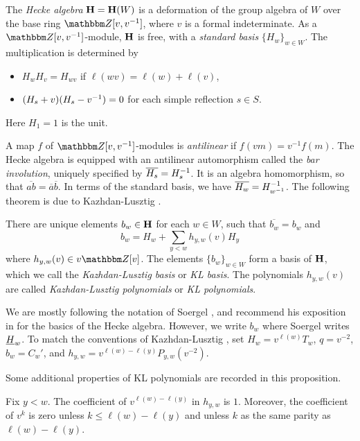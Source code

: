 The \emph{Hecke algebra} ${\mathbf H} = {\mathbf H}(W)$ is a deformation of the group algebra of $W$ over the base ring $\Z[v,v\inv]$, where $v$ is a formal indeterminate. As a $\Z[v,v\inv]$-module, ${\mathbf H}$ is free, with a \emph{standard basis} $\{H_w\}_{w \in W}$.  The multiplication is determined by
\begin{itemize}
\item $H_w H_v = H_{wv}$ if $\ell(wv)=\ell(w)+\ell(v)$,
\item $(H_s+v)(H_s-v^{-1})=0$ for each simple reflection $s\in S$.
\end{itemize}
Here $H_1 = 1$ is the unit.

A map $f$ of $\Z[v,v\inv]$-modules is \emph{antilinear} if $f(vm) = v^{-1} f(m)$. The Hecke algebra is equipped with an antilinear automorphism called the \emph{bar involution}, uniquely
specified by $\overline{H_s}=H_s^{-1}$. It is an algebra homomorphism, so that $\overline{ab}=\overline{a}\overline{b}$. In terms of the standard basis, we have $\overline{H_w} =
H_{w^{-1}}^{-1}$. The following theorem is due to Kazhdan-Lusztig \cite{KazLus79}.

\begin{theorem}\label{thm:KLbasis}
There are unique elements $b_w\in {\mathbf H}$ for each $w \in W$, such that $\overline{b_w}=b_w$ and
\[
b_w = H_w + \sum_{y< w} h_{y,w}(v) H_y
\]
where $h_{y,w}(v)\in v\Z[v]$. The elements $\{b_w\}_{w \in W}$ form a basis of ${\mathbf H}$, which we call the \emph{Kazhdan-Lusztig basis} or \emph{KL basis}. The polynomials $h_{y,w}(v)$ are called \emph{Kazhdan-Lusztig polynomials} or \emph{KL polynomials}.
\end{theorem}

\begin{remark}
We are mostly following the notation of Soergel \cite{Soer97}, and recommend his exposition in \cite[\S 2]{Soer97} for the basics of the Hecke algebra. However, we write $b_w$ where Soergel writes $\underline{H}_w$. To match the conventions of Kazhdan-Lusztig \cite{KazLus79}, set $H_w = v^{\ell(w)} T_w$, $q=v^{-2}$, $b_w = C_w'$, and $h_{y,w} = v^{\ell(w) - \ell(y)} P_{y,w}(v^{-2})$.
\end{remark}


Some additional properties of KL polynomials are recorded in this proposition.

\begin{prop} \label{prop:KLpolyprops} Fix $y < w$. The coefficient of $v^{\ell(w) - \ell(y)}$ in $h_{y,w}$ is $1$. Moreover, the coefficient of $v^k$ is zero unless $k \le \ell(w) -
\ell(y)$ and unless $k$ as the same parity as $\ell(w) - \ell(y)$. \end{prop}

